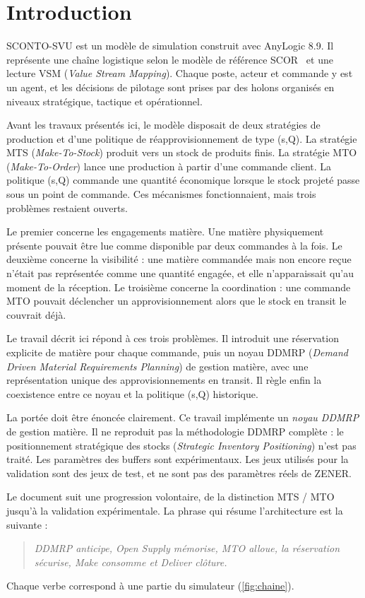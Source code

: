 \chapter{Introduction}\label{ch:intro}

SCONTO-SVU est un modèle de simulation construit avec AnyLogic 8.9. Il représente une
chaîne logistique selon le modèle de référence SCOR~\cite{apics2017} et une lecture VSM
(\textit{Value Stream Mapping}). Chaque poste, acteur et commande y est un agent, et les
décisions de pilotage sont prises par des holons organisés en niveaux stratégique,
tactique et opérationnel.

Avant les travaux présentés ici, le modèle disposait de deux stratégies de production et
d'une politique de réapprovisionnement de type (s,Q). La stratégie MTS
(\textit{Make-To-Stock}) produit vers un stock de produits finis. La stratégie MTO
(\textit{Make-To-Order}) lance une production à partir d'une commande client. La politique
(s,Q) commande une quantité économique lorsque le stock projeté passe sous un point de
commande. Ces mécanismes fonctionnaient, mais trois problèmes restaient ouverts.

Le premier concerne les engagements matière. Une matière physiquement présente pouvait être
lue comme disponible par deux commandes à la fois. Le deuxième concerne la visibilité : une
matière commandée mais non encore reçue n'était pas représentée comme une quantité engagée,
et elle n'apparaissait qu'au moment de la réception. Le troisième concerne la coordination :
une commande MTO pouvait déclencher un approvisionnement alors que le stock en transit le
couvrait déjà.

Le travail décrit ici répond à ces trois problèmes. Il introduit une réservation explicite
de matière pour chaque commande, puis un noyau DDMRP (\textit{Demand Driven Material
Requirements Planning}) de gestion matière, avec une représentation unique des
approvisionnements en transit. Il règle enfin la coexistence entre ce noyau et la politique
(s,Q) historique.

La portée doit être énoncée clairement. Ce travail implémente un \emph{noyau DDMRP} de
gestion matière. Il ne reproduit pas la méthodologie DDMRP complète : le positionnement
stratégique des stocks (\textit{Strategic Inventory Positioning}) n'est pas traité. Les
paramètres des buffers sont expérimentaux. Les jeux utilisés pour la validation sont des
jeux de test, et ne sont pas des paramètres réels de ZENER.

Le document suit une progression volontaire, de la distinction MTS / MTO jusqu'à la
validation expérimentale. La phrase qui résume l'architecture est la suivante :
\begin{quote}
\itshape DDMRP anticipe, Open Supply mémorise, MTO alloue, la réservation sécurise,
Make consomme et Deliver clôture.
\end{quote}
Chaque verbe correspond à une partie du simulateur (\cref{fig:chaine}).



